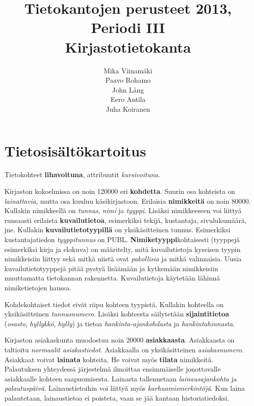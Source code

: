 \documentclass{article}
\title{Tietokantojen perusteet 2013, Periodi III \\ Kirjastotietokanta}
\author{Mika Viinamäki \\ Paavo Rohamo \\ John Lång \\ Eero Antila \\ Juha Koiranen}
\let\stdsection\section
\renewcommand\section{\newpage\stdsection}
\begin{document}
\begin{titlepage}
\maketitle
\end{titlepage}

\setcounter{page}{2}

\section{Tietosisältökartoitus}

Tietokohteet \textbf{lihavoituna}, attribuutit \textit{kursivoituna}.

Kirjaston kokoelmissa on noin 120000 eri \textbf{kohdetta}. Suurin osa kohteista on \textit{lainattavia}, mutta osa kuuluu käsikirjastoon. Erilaisia \textbf{nimikkeitä} on noin 80000. Kullakin nimikkeellä on \textit{tunnus}, \textit{nimi} ja \textit{tyyppi}. Lisäksi nimikkeeseen voi liittyä runsaasti erilaista \textbf{kuvailutietoa}, esimerkiksi tekijä, kustantaja, sivulukumäärä, jne. Kullakin \textbf{kuvailutietotyypillä} on yksikäsitteinen tunnus. Esimerkiksi kustantajatiedon \textit{tyyppitunnus} on PUBL. \textbf{Nimiketyyppi}kohtaisesti (tyyppejä esimerkiksi kirja ja elokuva) on määritelty, mitä kuvailutietoja kyseisen tyypin nimikkeisiin liittyy sekä mitkä niistä ovat \textit{pakollisia} ja mitkä valinnaisia. Uusia kuvailutietotyyppejä pitää pystyä lisäämään ja kytkemään nimikkeisiin muuttamatta tietokannan rakennetta. Kuvailutietoja käytetään lähinnä nimiketietojen haussa.

Kohdekohtaiset tiedot eivät riipu kohteen tyypistä. Kullakin kohteella on yksikäsitteinen \textit{tunnusnumero}. Lisäksi kohteesta säilytetään \textbf{sijaintitietoa} (\textit{osasto}, \textit{hyllykkö}, \textit{hylly}) ja tietoa \textit{hankinta-ajankohdasta} ja \textit{hankintahinnasta}.

Kirjaston asiakaskunta muodostuu noin 20000 \textbf{asiakkaasta}. Asiakkaasta on taltioitu \emph{normaalit asiakastiedot}. Asiakkaalla on yksikäsitteinen \emph{asiakasnumero}. Asiakkaat voivat \textbf{lainata} kohteita. He voivat myös \textbf{tilata} nimikkeitä. Palautuksen yhteydessä järjestelmä ilmoittaa ensimmäiselle jonottavalle asiakkaalle kohteen saapuomisesta. Lainasta tallennetaan \emph{lainausajankohta} ja \emph{palautuspäivä}. Lainaustietoihin voi liittyä myös \emph{karhuamismerkintöjä}. Kun laina palautetaan, lainaustietoa ei poisteta, vaan se jää kantaan historiatiedoksi. 
\end{document}
